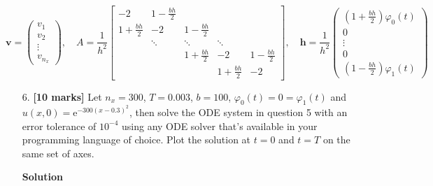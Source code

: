 \documentclass[12pt,a4paper]{article}
\begin{document}
\begin{equation*}
\mathbf{v} = \left(\begin{array}{c}
v_1\\
v_2 \\
\vdots \\
v_{n_x}
\end{array}
\right), \quad A = \frac{1}{h^2}\begin{bmatrix}
-2 & 1 - \frac{bh}{2} & & & \\
1 + \frac{bh}{2}  & -2 & 1 - \frac{bh}{2}  & & \\
      & \ddots & \ddots & \ddots & \\
      &        & 1 + \frac{bh}{2}    & -2 & 1 - \frac{bh}{2} \\
      &        &        &1 + \frac{bh}{2}      & -2
\end{bmatrix}, \quad
\mathbf{h} = \frac{1}{h^2}\left(\begin{array}{c} 
\left(1 + \frac{bh}{2}\right)\varphi_0(t)\\
0 \\
\vdots \\
0 \\
\left(1 - \frac{bh}{2}\right)\varphi_1(t)
\end{array}
\right)
\end{equation*}
\begin{itemize}
\item[6. ] \textbf{[10 marks]} Let $n_x = 300$, $T = 0.003$, $b = 100$, $\varphi_0(t) = 0 = \varphi_1(t)$ and $u(x,0) = \mathrm{e}^{-300(x-0.3)^2}$, then solve the ODE system in question 5 with an error tolerance of $10^{-4}$ using any ODE solver that's available in your programming language of choice.  Plot the solution at $t = 0$ and $t = T$ on the same set of axes.

\textbf{Solution}

\end{itemize}
\end{document}
